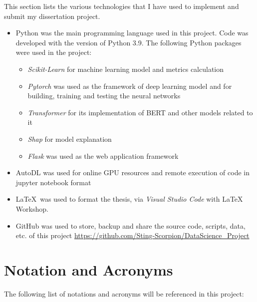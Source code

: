 \documentclass[ %
                    author={Louis Wang},
                supervisor={Dr. Qiang Liu},
                    degree={MSc},
                     title={Identification of Suicide Ideation in Texts},
                      type={},
                      year={2024}]{dissertation}
\begin{document}
\noindent
This section lists the various technologies that I have used to implement and submit my dissertation project.

\begin{itemize}

\item Python was the main programming language used in this project. Code was developed with the version of Python 3.9. 
The following Python packages were used in the project:

\begin{itemize}
      \item {\em Scikit-Learn} for machine learning model and metrics calculation
      \item {\em Pytorch} was used as the framework of deep learning model and for building, training and testing the neural networks
      \item {\em Transformer} for its implementation of BERT and other models related to it
      \item {\em Shap} for model explanation
      \item {\em Flask} was used as the web application framework 
\end{itemize}

\item AutoDL was used for online GPU resources and remote execution of code in jupyter notebook format
 
\item \LaTeX\ was used to format the thesis, via {\em Visual Studio Code} with LaTeX Workshop. 

\item GitHub was used to store, backup and share the source code, scripts, data, etc. of this project
\url{https://github.com/Sting-Scorpion/DataScience_Project}

\end{itemize}


\chapter*{Notation and Acronyms}

\noindent
The following list of notations and acronyms will be referenced in this project:
\end{document}
